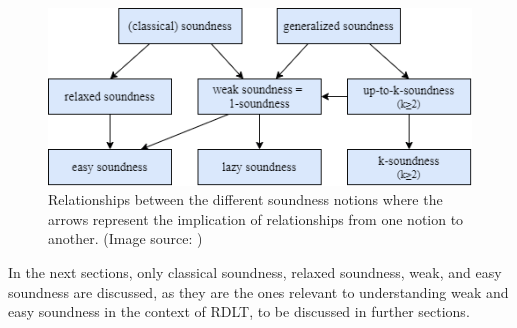 \begin{figure}[H]
    \centering
    \includegraphics[width=13cm]{../figures/Relationships between Soundness Notions.png}
    \caption{Relationships between the different soundness notions where the arrows represent the implication of relationships from one notion to another. (Image source: \cite{Aalst2011})}
    \label{SoundnessRelationships}
\end{figure}
In the next sections, only classical soundness, relaxed soundness, weak, and easy soundness are discussed, as they are the ones relevant to understanding weak and easy soundness in the context of RDLT, to be discussed in further sections.

